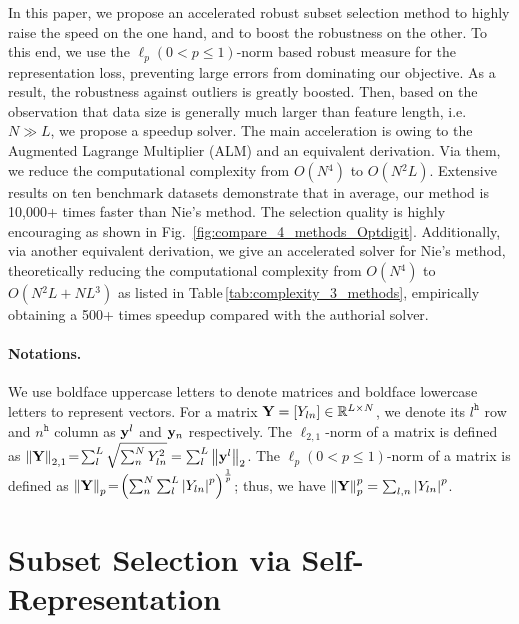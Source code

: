 \documentclass[a4paper]{article}
\begin{document}
In this paper, we propose an accelerated robust subset selection method
to highly raise the speed on the one hand, and to boost the robustness
on the other. To this end, we use the $\ell_{p}\left(0\!<\! p\!\leq\!1\right)$-norm
based robust measure for the representation loss, preventing large
errors from dominating our objective. As a result, the robustness
against outliers is greatly boosted. Then, based on the observation
that data size is generally much larger than feature length, i.e.
$N\!\gg\! L$, we propose a speedup solver. The main acceleration
is owing to the Augmented Lagrange Multiplier (ALM) and an equivalent
derivation. Via them, we reduce the computational complexity from
$O\left(N{}^{4}\right)$ to $O\left(N{}^{2}L\right)$. Extensive results
on ten benchmark datasets demonstrate that in average, our method
is 10,000+ times faster than Nie's method. The selection quality is
highly encouraging as shown in Fig.\ \ref{fig:compare_4_methods_Optdigit}.
Additionally, via another equivalent derivation, we give an accelerated
solver for Nie's method, theoretically reducing the computational
complexity from $O\left(N{}^{4}\right)$ to $O\left(N{}^{2}L+NL{}^{3}\right)$
as listed in Table\,\ref{tab:complexity_3_methods}, empirically
obtaining a 500+ times speedup compared with the authorial solver. 


\paragraph{Notations. }

We use boldface uppercase letters to denote matrices and boldface
lowercase letters to represent vectors. For a matrix $\mathbf{Y}=\left[Y_{ln}\right]\in\mathbb{R}^{L\times N}$,
we denote its $l^{\mtth}$ row and $n^{\mtth}$ column as $\mathbf{y}^{l}$
and $\mathbf{y}_{n}$ respectively. The $\ell_{2,1}$-norm of a matrix
is defined as $\left\Vert \mathbf{Y}\right\Vert _{2,1}\!=\!\sum_{l}^{L}\sqrt{\sum_{n}^{N}Y_{ln}^{2}}=\sum_{l}^{L}\left\Vert \mathbf{y}^{l}\right\Vert _{2}$.
The $\ell_{p}\left(0<p\leq1\right)$-norm of a matrix is defined as
$\left\Vert \mathbf{Y}\right\Vert _{p}\!=\!\left(\sum_{n}^{N}\sum_{l}^{L}\left|Y_{ln}\right|^{p}\right)^{\frac{1}{p}}$;
thus, we have $\left\Vert \mathbf{Y}\right\Vert _{p}^{p}=\sum_{l,n}\left|Y_{ln}\right|^{p}$. 


\section{Subset Selection via Self-Representation}
\end{document}
